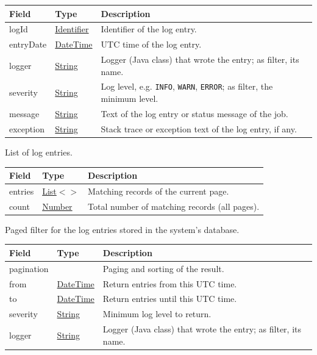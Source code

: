 \documentclass[a4paper]{arrowhead}
\newcommand{\mref}[2][]{{\textcolor{ArrowheadPurple}{\hyperref[sec:model:#2]{\ifstrempty{#1}{#2}{#1}}}}}
\newcommand{\pref}[1]{{\textcolor{ArrowheadGrey}{\hyperref[sec:model:primitives:#1]{#1}}}}
\begin{document}
\noindent\begin{tabularx}{\textwidth}{| >{\raggedright\arraybackslash}p{3.9cm} | >{\raggedright\arraybackslash\small}p{5.3cm} | X |} \hline
\rowcolor{gray!33} Field & Type & Description \\ \hline
log\allowbreak{}Id & \pref{Identifier} & Identifier of the log entry. \\ \hline
entry\allowbreak{}Date & \pref{DateTime} & UTC time of the log entry. \\ \hline
logger & \pref{String} & Logger (Java class) that wrote the entry; as filter, its name. \\ \hline
severity & \pref{String} & Log level, e.g. \texttt{INFO}, \texttt{WARN}, \texttt{ERROR}; as filter, the minimum level. \\ \hline
message & \pref{String} & Text of the log entry or status message of the job. \\ \hline
exception & \pref{String} & Stack trace or exception text of the log entry, if any. \\ \hline
\end{tabularx}




List of log entries.


\noindent\begin{tabularx}{\textwidth}{| >{\raggedright\arraybackslash}p{3.9cm} | >{\raggedright\arraybackslash\small}p{5.3cm} | X |} \hline
\rowcolor{gray!33} Field & Type & Description \\ \hline
entries & \pref{List}$<$\allowbreak{}\mref{LogEntry}$>$ & Matching records of the current page. \\ \hline
count & \pref{Number} & Total number of matching records (all pages). \\ \hline
\end{tabularx}




Paged filter for the log entries stored in the system's database.


\noindent\begin{tabularx}{\textwidth}{| >{\raggedright\arraybackslash}p{3.9cm} | >{\raggedright\arraybackslash\small}p{5.3cm} | X |} \hline
\rowcolor{gray!33} Field & Type & Description \\ \hline
pagination & \mref{Page} & Paging and sorting of the result. \\ \hline
from & \pref{DateTime} & Return entries from this UTC time. \\ \hline
to & \pref{DateTime} & Return entries until this UTC time. \\ \hline
severity & \pref{String} & Minimum log level to return. \\ \hline
logger & \pref{String} & Logger (Java class) that wrote the entry; as filter, its name. \\ \hline
\end{tabularx}
\end{document}
